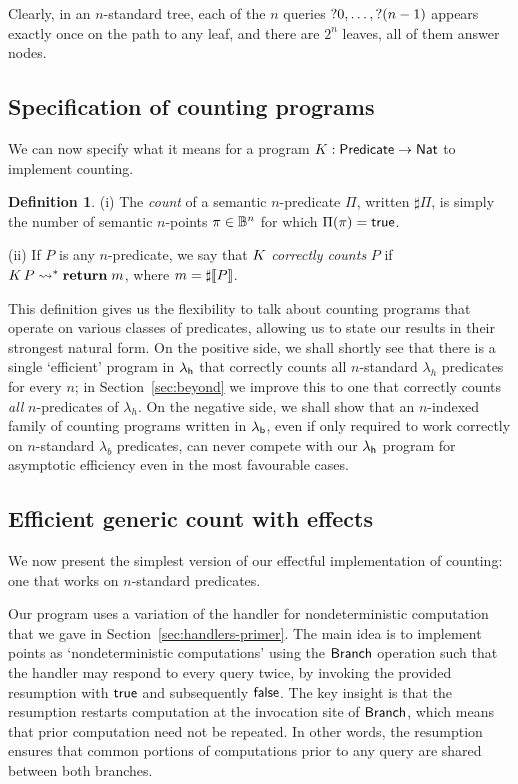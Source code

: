 \documentclass[12pt,phd,lfcs,twoside,openright,logo,leftchapter,normalheadings]{infthesis}
\theoremstyle{plain}
\theoremstyle{definition}
\newtheorem{definition}[theorem]{Definition}
\begin{document}
Clearly, in an $n$-standard tree, each of the $n$ queries $\mathord{?} 0,\dots, \mathord{?}(n-1)$
appears exactly once on the path to any leaf, and there are $2^n$ leaves, all of them answer nodes.

\subsection{Specification of counting programs}
\label{sec:counting}

We can now specify what it means for a program
$K : \mathsf{Predicate} \to \mathsf{Nat}$ to implement counting.

\begin{definition} \label{def:counting-function}
(i) The \emph{count} of a semantic $n$-predicate $\Pi$, written $\sharp \Pi$,
is simply the number of semantic $n$-points $\pi \in \mathbb{B}^n$ for which $\Pi(\pi)=\mathsf{true}$.

(ii) If $P$ is any $n$-predicate, we say that $K$ \emph{correctly counts} $P$ if
$K\,P \leadsto^\ast \mathbf{return}\;m$, where $m = \sharp \val{P}$.
\end{definition}

This definition gives us the flexibility to talk about counting
programs that operate on various classes of predicates, allowing us to
state our results in their strongest natural form. On the positive
side, we shall shortly see that there is a single `efficient' program
in $\lambda_{\mathsf{h}}$ that correctly counts all $n$-standard $\lambda_h$
predicates for every $n$; in Section~\ref{sec:beyond} we improve this
to one that correctly counts \emph{all} $n$-predicates of $\lambda_h$.
On the negative side, we shall show that an $n$-indexed family of
counting programs written in $\lambda_{\mathsf{b}}$, even if only required to work
correctly on $n$-standard $\lambda_b$ predicates, can never compete
with our $\lambda_{\mathsf{h}}$ program for asymptotic efficiency even in the most
favourable cases.

\subsection{Efficient generic count with effects}
\label{sec:effectful-counting}

We now present the simplest version of our effectful implementation of
counting: one that works on $n$-standard predicates.

Our program uses a variation of the handler for
nondeterministic computation that we gave in
Section~\ref{sec:handlers-primer}.
The main idea is to implement points as `nondeterministic computations'
using the $\mathsf{Branch}$ operation such that the handler may respond to every query twice,
by invoking the provided resumption with $\mathsf{true}$ and subsequently $\mathsf{false}$.
The key insight is that the resumption restarts computation at the invocation
site of $\mathsf{Branch}$, which means that prior computation need not be repeated.
In other words, the resumption ensures that common portions of computations
prior to any query are shared between both branches.
\end{document}
